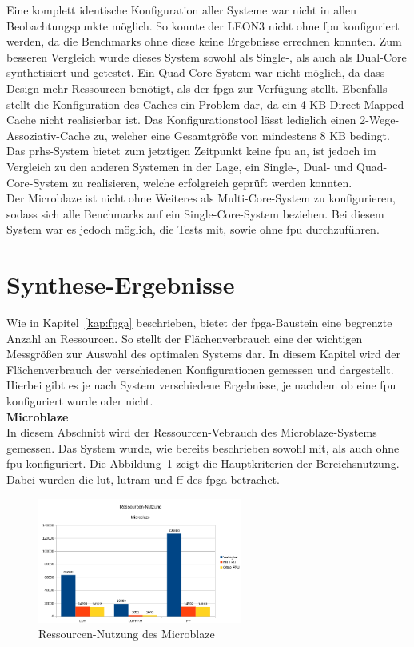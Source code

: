Eine komplett identische Konfiguration aller Systeme war nicht in allen Beobachtungspunkte möglich. So konnte der LEON3 nicht ohne \ac{fpu} konfiguriert werden, da die Benchmarks ohne diese
keine Ergebnisse errechnen konnten. Zum besseren Vergleich wurde dieses System sowohl als Single-, als auch als Dual-Core synthetisiert und getestet. Ein Quad-Core-System war nicht möglich,
da dass Design mehr Ressourcen benötigt, als der \ac{fpga} zur Verfügung stellt. Ebenfalls stellt die Konfiguration
des Caches ein Problem dar, da ein 4 KB-Direct-Mapped-Cache nicht realisierbar ist. Das Konfigurationstool lässt lediglich einen 2-Wege-Assoziativ-Cache zu, welcher eine Gesamtgröße von
mindestens 8 KB bedingt.\\
Das \ac{prhs}-System bietet zum jetztigen Zeitpunkt keine \ac{fpu} an, ist jedoch im Vergleich zu den anderen Systemen in der Lage, ein Single-, Dual- und Quad-Core-System zu realisieren,
 welche erfolgreich geprüft werden konnten.\\
 Der Microblaze ist nicht ohne Weiteres als Multi-Core-System zu konfigurieren, sodass sich alle Benchmarks auf ein Single-Core-System beziehen. Bei diesem System war es jedoch möglich,
 die Tests mit, sowie ohne \ac{fpu} durchzuführen.\\


\newpage
\section{Synthese-Ergebnisse}\label{kap:synthese}
Wie in Kapitel~\ref{kap:fpga} beschrieben, bietet der \ac{fpga}-Baustein eine begrenzte Anzahl an Ressourcen. So stellt der Flächenverbrauch eine der wichtigen Messgrößen zur Auswahl des
optimalen Systems dar. In diesem Kapitel wird der Flächenverbrauch der verschiedenen Konfigurationen gemessen und dargestellt. Hierbei gibt es je nach System verschiedene Ergebnisse, je nachdem
ob eine \ac{fpu} konfiguriert wurde oder nicht.\\

\textbf{Microblaze}\\
In diesem Abschnitt wird der Ressourcen-Vebrauch des Microblaze-Systems gemessen. Das System wurde, wie bereits beschrieben sowohl mit, als auch ohne \ac{fpu} konfiguriert.
Die Abbildung~\ref{fig:ressourcenmb1} zeigt die Hauptkriterien der Bereichsnutzung. Dabei wurden die \ac{lut}, \ac{lutram} und \ac{ff} des \ac{fpga} betrachet.\\

\begin{figure}[H]
\centering
\includegraphics[width=0.6\textwidth]{Hauptteil/ressourcenmb1.png}
\caption{Ressourcen-Nutzung des Microblaze}
\label{fig:ressourcenmb1}
\end{figure}

